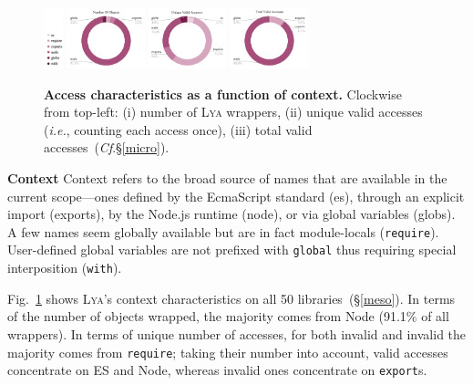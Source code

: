 \documentclass[letterpaper,twocolumn,10pt]{article}
\def\ie{{\em i.e.}, }
\newcommand{\heading}[1]{\vspace{2pt}\noindent\textbf{#1}\enspace}
\newcommand{\ttt}[1]{\texttt{#1}}
\newcommand{\cf}[1]{(\emph{Cf}.\S\ref{#1})}
\newcommand{\sx}[1]{(\S\ref{#1})}
\newcommand{\sys}{{\scshape Lya}\xspace}
\begin{document}
\begin{figure}
  \centering
  \includegraphics[width=0.05\textwidth]{./figs/lya_donut_index}
  \includegraphics[width=0.20\textwidth]{./figs/lya_ctx_obj}
  \includegraphics[width=0.20\textwidth]{./figs/lya_ctx_unique_valid}
  \includegraphics[width=0.20\textwidth]{./figs/lya_ctx_total_valid}
  \caption{
    \textbf{Access characteristics as a function of context.}
    Clockwise from top-left:
    (i) number of \sys wrappers,
    (ii) unique valid accesses (\ie counting each access once),
    (iii) total valid accesses~\cf{micro}.
    \vspace{-4mm}
  }
  \label{fig:objects}
\end{figure}

\heading{Context}
Context refers to the broad source of names that are available in the current scope---ones
  defined by the EcmaScript standard (es), 
  through an explicit import (exports),
  by the Node.js runtime (node), or
  via global variables (globs).
A few names seem globally available but are in fact module-locals (\ttt{require}).
User-defined global variables are not prefixed with \ttt{global} thus requiring special interposition (\ttt{with}).

Fig.~\ref{fig:objects} shows \sys's context characteristics on all 50 libraries~\sx{meso}. %
In terms of the number of objects wrapped, the majority comes from Node (91.1\% of all wrappers).
In terms of unique number of accesses, for both invalid and invalid the majority comes from \ttt{require};
  taking their number into account, valid accesses concentrate on ES and Node, whereas invalid ones concentrate on \ttt{export}s.
\end{document}
